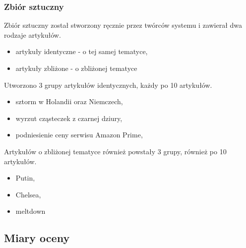 \subsubsection{Zbiór sztuczny}

Zbiór sztuczny został stworzony ręcznie przez twórców systemu i zawierał dwa rodzaje
artykułów. 
\begin{itemize}
\item artykuły identyczne - o tej samej tematyce,
\item artykuły zbliżone - o zbliżonej tematyce
\end{itemize}

Utworzono 3 grupy artykułów identycznych, każdy po 10 artykułów.
\begin{itemize}
\item sztorm w Holandii oraz Niemczech,
\item wyrzut cząsteczek z czarnej dziury,
\item podniesienie ceny serwisu Amazon Prime,
\end{itemize}

Artykułów o zbliżonej tematyce również powstały 3 grupy, również po 10 artykułów.
\begin{itemize}
\item Putin,
\item Chelsea,
\item meltdown
\end{itemize}

\subsection{Miary oceny}

